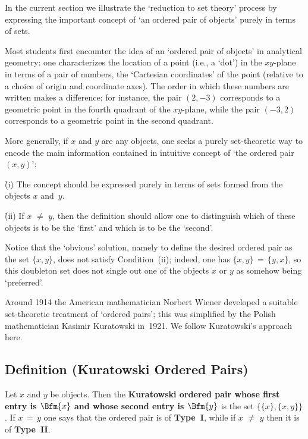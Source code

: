 \V


    In the current section we illustrate the `reduction to set theory' process by expressing the important concept of `an ordered pair of objects' purely in terms of sets.

        Most students first encounter the idea of an `ordered pair of objects' in analytical geometry:
    one characterizes the location of a point (i.e., a `dot') in the $xy$-plane in terms of a pair of numbers,
    the `Cartesian coordinates' of the point (relative to a choice of origin and coordinate axes).
    The order in which these numbers are written makes a difference; for instance,
    the pair $(2,-3)$ corresponds to a geometric point in the fourth quadrant of the $xy$-plane,
    while the pair $(-3,2)$ corresponds to a geometric point in the second quadrant.

        More generally, if $x$ and $y$ are any objects, one seeks a purely set-theoretic way to encode the main information contained in intuitive concept of `the ordered pair $(x,y)$':

\VA

        \h (i) The concept should be expressed purely in terms of sets formed from the objects $x$ and~$y$.

        \h (ii) If $x \,\,{\neq}\,\, y$, then the definition should allow one to distinguish which of these objects is to be the `first' and which is to be the `second'.

\VA

\noindent Notice that the `obvious' solution, namely to define the desired ordered pair as the set $\{x,y\}$, does not satisfy Condition~(ii);
    indeed, one has $\{x,y\} \,=\, \{y,x\}$, so this doubleton set does not single out one of the objects $x$ or $y$ as somehow being `preferred'.

        Around 1914 the American mathematician Norbert Wiener developed a suitable set-theoretic treatment of `ordered pairs';
    this was simplified by the Polish mathematician Kasimir Kuratowski in~1921. We follow Kuratowski's approach here.

\V
\V

        \subsection{\small{{\bf Definition} (Kuratowski Ordered Pairs})}
        \label{DefA12.10}

        Let $x$ and $y$ be objects. Then the {\bf Kuratowski ordered pair whose first entry is $\Bfm{x}$ and whose second entry is $\Bfm{y}$} is the set $\{\{x\},\{x,y\}\}$.
    If $x \,=\, y$ one says that the ordered pair is of {\bf Type~I}, while if $x \,\,{\neq}\,\, y$ then it is of {\bf Type~II}.

